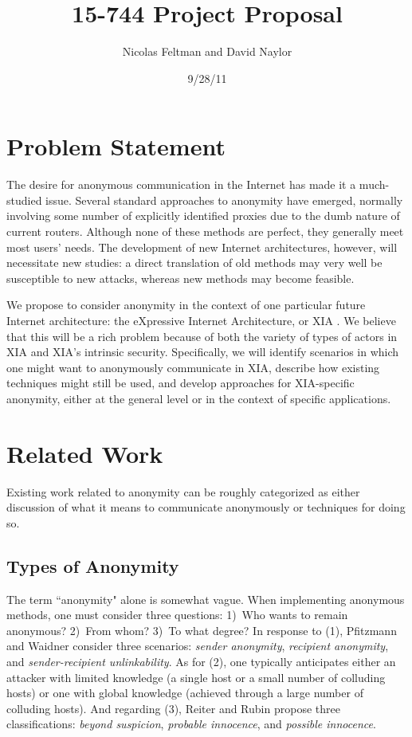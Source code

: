 \documentclass[11pt]{article}
\title{15-744 Project Proposal}
\author{Nicolas Feltman and David Naylor}
\date{9/28/11}
\begin{document}
\maketitle

\section{Problem Statement}
The desire for anonymous communication in the Internet has made it a much-studied issue. Several standard approaches to anonymity have emerged, normally involving some number of explicitly identified proxies  due to the dumb nature of current routers. Although none of these methods are perfect, they generally meet most users' needs. The development of new Internet architectures, however, will necessitate new studies: a direct translation of old methods may very well be susceptible to new attacks, whereas new methods may become feasible.  

We propose to consider anonymity in the context of one particular future Internet architecture: the eXpressive Internet Architecture, or XIA \cite{xia}.  We believe that this will be a rich problem because of  both the variety of types of actors in XIA and XIA's intrinsic security.  Specifically, we will identify scenarios in which one might want to anonymously communicate in XIA, describe how existing techniques might still be used, and develop approaches for XIA-specific anonymity, either at the general level or in the context of specific applications.


\section{Related Work}
Existing work related to anonymity can be roughly categorized as either discussion of what it means to communicate anonymously or techniques for doing so.

\subsection{Types of Anonymity}
The term ``anonymity" alone is somewhat vague.  When implementing anonymous methods, one must consider three questions: 1)~Who wants to remain anonymous? 2)~From whom? 3)~To what degree? In response to (1), Pfitzmann and Waidner \cite{PW87} consider three scenarios: \emph{sender anonymity}, \emph{recipient anonymity}, and \emph{sender-recipient unlinkability}. As for (2), one typically anticipates either an attacker with limited knowledge (a single host or a small number of colluding hosts) or one with global knowledge (achieved through a large number of colluding hosts). And regarding (3), Reiter and Rubin \cite{RR98} propose three classifications: \emph{beyond suspicion}, \emph{probable innocence}, and \emph{possible innocence}.
\end{document}
